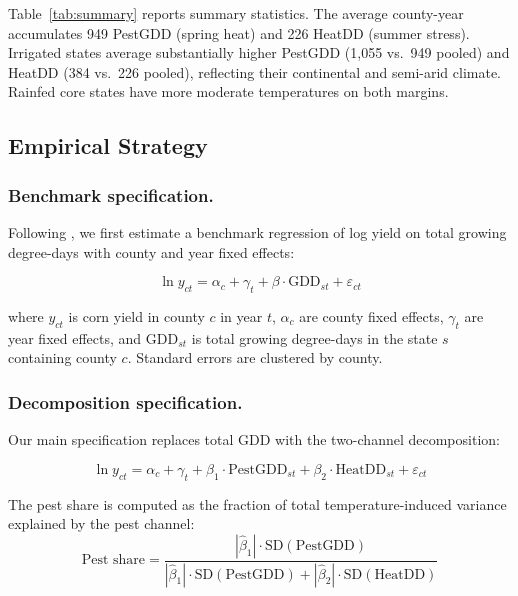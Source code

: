 \documentclass[12pt]{article}
\begin{document}
Table~\ref{tab:summary} reports summary statistics. The average county-year accumulates 949 PestGDD (spring heat) and 226 HeatDD (summer stress). Irrigated states average substantially higher PestGDD (1,055 vs.\ 949 pooled) and HeatDD (384 vs.\ 226 pooled), reflecting their continental and semi-arid climate. Rainfed core states have more moderate temperatures on both margins.



\subsection{Empirical Strategy}

\subsubsection*{Benchmark specification.}
Following \citet{schlenker2009nonlinear}, we first estimate a benchmark regression of log yield on total growing degree-days with county and year fixed effects:

\begin{equation}
\ln y_{ct} = \alpha_c + \gamma_t + \beta \cdot \text{GDD}_{st} + \varepsilon_{ct}
\label{eq:benchmark}
\end{equation}

where $y_{ct}$ is corn yield in county $c$ in year $t$, $\alpha_c$ are county fixed effects, $\gamma_t$ are year fixed effects, and $\text{GDD}_{st}$ is total growing degree-days in the state $s$ containing county $c$. Standard errors are clustered by county.

\subsubsection*{Decomposition specification.}
Our main specification replaces total GDD with the two-channel decomposition:

\begin{equation}
\ln y_{ct} = \alpha_c + \gamma_t + \beta_1 \cdot \text{PestGDD}_{st} + \beta_2 \cdot \text{HeatDD}_{st} + \varepsilon_{ct}
\label{eq:decomp}
\end{equation}

The pest share is computed as the fraction of total temperature-induced variance explained by the pest channel:
\[
\text{Pest share} = \frac{|\hat{\beta}_1| \cdot \text{SD}(\text{PestGDD})}{|\hat{\beta}_1| \cdot \text{SD}(\text{PestGDD}) + |\hat{\beta}_2| \cdot \text{SD}(\text{HeatDD})}
\]
\end{document}
